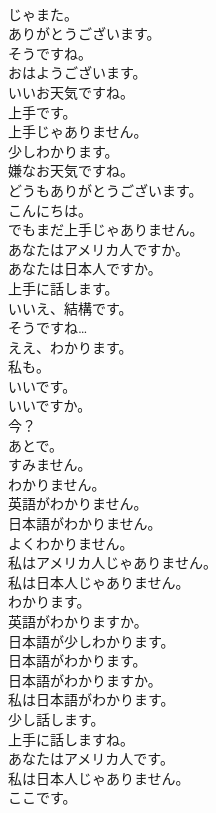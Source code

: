 \documentclass[8pt]{extreport}
\begin{document}
\begin{CJK}{UTF8}{min}
\\	じゃまた。	
\\	ありがとうございます。	
\\	そうですね。	
\\	おはようございます。	
\\	いいお天気ですね。	
\\	上手です。	
\\	上手じゃありません。	
\\	少しわかります。	
\\	嫌なお天気ですね。	
\\	どうもありがとうございます。	
\\	こんにちは。	
\\	でもまだ上手じゃありません。	
\\	あなたはアメリカ人ですか。	
\\	あなたは日本人ですか。	
\\	上手に話します。	
\\	いいえ、結構です。	
\\	そうですね…	
\\	ええ、わかります。	
\\	私も。	
\\	いいです。	
\\	いいですか。	
\\	今？	
\\	あとで。	
\\	すみません。	
\\	わかりません。	
\\	英語がわかりません。	
\\	日本語がわかりません。	
\\	よくわかりません。	
\\	私はアメリカ人じゃありません。	
\\	私は日本人じゃありません。	
\\	わかります。	
\\	英語がわかりますか。	
\\	日本語が少しわかります。	
\\	日本語がわかります。	
\\	日本語がわかりますか。	
\\	私は日本語がわかります。	
\\	少し話します。	
\\	上手に話しますね。	
\\	あなたはアメリカ人です。	
\\	私は日本人じゃありません。	
\\	ここです。	

\end{CJK}
\end{document}
